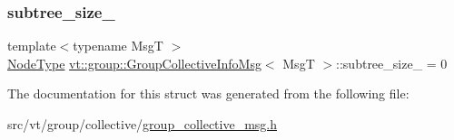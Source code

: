\subsubsection{\texorpdfstring{subtree\+\_\+size\+\_\+}{subtree\_size\_}}
{\footnotesize\ttfamily template$<$typename MsgT $>$ \\
\hyperlink{namespacevt_a866da9d0efc19c0a1ce79e9e492f47e2}{Node\+Type} \hyperlink{structvt_1_1group_1_1_group_collective_info_msg}{vt\+::group\+::\+Group\+Collective\+Info\+Msg}$<$ MsgT $>$\+::subtree\+\_\+size\+\_\+ = 0\hspace{0.3cm}{\ttfamily [private]}}



The documentation for this struct was generated from the following file\+:\begin{DoxyCompactItemize}
\item 
src/vt/group/collective/\hyperlink{group__collective__msg_8h}{group\+\_\+collective\+\_\+msg.\+h}\end{DoxyCompactItemize}
